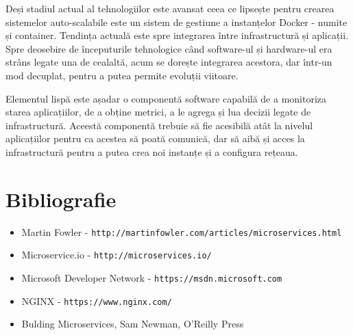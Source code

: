 \documentclass[12pt, a4paper, oneside, romanian]{teza-upb}
\begin{document}
Deși stadiul actual al tehnologiilor este avansat ceea ce lipsește pentru crearea sistemelor auto-scalabile este un sistem de gestiune a instanțelor Docker - numite și container. Tendința actuală este spre integrarea între infrastructură și aplicații. Spre deosebire de începuturile tehnologice când software-ul și hardware-ul era strâns legate una de cealaltă, acum se dorește integrarea acestora, dar într-un mod decuplat, pentru a putea permite evoluții viitoare.

Elementul lispă este așadar o componentă software capabilă de a monitoriza starea aplicațiilor, de a obține metrici, a le agrega și lua decizii legate de infrastructură. Aceestă componentă trebuie să fie acesibilă atât la nivelul aplicațiilor pentru ca acestea să poată comunică, dar să aibă și acces la infrastructură pentru a putea crea noi instanțe și a configura rețeaua. 


\chapter{Bibliografie}

\begin{itemize}
 \item Martin Fowler - \texttt{http://martinfowler.com/articles/microservices.html}
 \item Microservice.io - \texttt{http://microservices.io/}
 \item Microsoft Developer Network - \texttt{https://msdn.microsoft.com}
 \item NGINX - \texttt{https://www.nginx.com/}
 \item Bulding Microservices, Sam Newman, O'Reilly Press
\end{itemize}	
\end{document}

